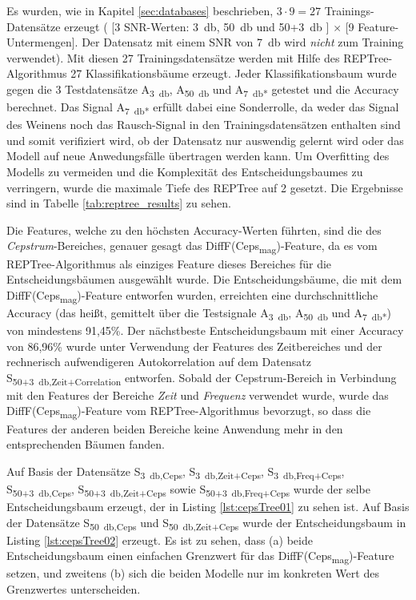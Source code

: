 Es wurden, wie in Kapitel \ref{sec:databases} beschrieben, $3 \cdot 9 = 27$ Trainings-Datensätze erzeugt ( [3 SNR-Werten: \SI{3}{\decibel}, \SI{50}{\decibel} und 50+\SI{3}{\decibel} ] $\times$ [9 Feature-Untermengen]. Der Datensatz mit einem SNR von \SI{7}{\decibel} wird \emph{nicht} zum Training verwendet). Mit diesen 27 Trainingsdatensätze werden mit Hilfe des REPTree-Algorithmus 27 Klassifikationsbäume erzeugt. Jeder Klassifikationsbaum wurde gegen die 3 Testdatensätze A\textsubscript{\SI{3}{\decibel}}, A\textsubscript{\SI{50}{\decibel}} und A\textsubscript{\SI{7}{\decibel}*} getestet und die Accuracy berechnet. Das Signal A\textsubscript{\SI{7}{\decibel}*} erfüllt dabei eine Sonderrolle, da weder das Signal des Weinens noch das Rausch-Signal in den Trainingsdatensätzen enthalten sind und somit verifiziert wird, ob der Datensatz nur \glqq auswendig gelernt\grqq{} wird oder das Modell auf neue Anwedungsfälle übertragen werden kann. Um Overfitting des Modells zu vermeiden und die Komplexität des Entscheidungsbaumes zu verringern, wurde die maximale Tiefe des REPTree auf 2 gesetzt. Die Ergebnisse sind in Tabelle \ref{tab:reptree_results} zu sehen.

Die Features, welche zu den höchsten Accuracy-Werten führten, sind die des \emph{Cepstrum}-Bereiches, genauer gesagt das DiffF(Ceps\textsubscript{mag})-Feature, da es vom REPTree-Algorithmus als einziges Feature dieses Bereiches für die Entscheidungsbäumen ausgewählt wurde. Die Entscheidungsbäume, die mit dem DiffF(Ceps\textsubscript{mag})-Feature entworfen wurden, erreichten eine durchschnittliche Accuracy (das heißt, gemittelt über die Testsignale A\textsubscript{\SI{3}{\decibel}}, A\textsubscript{\SI{50}{\decibel}} und A\textsubscript{\SI{7}{\decibel}*}) von mindestens 91,45\%. Der nächstbeste Entscheidungsbaum mit einer Accuracy von 86,96\% wurde unter Verwendung der Features des Zeitbereiches und der rechnerisch aufwendigeren Autokorrelation auf dem Datensatz S\textsubscript{50+\SI{3}{\decibel},Zeit+Correlation} entworfen. Sobald der Cepstrum-Bereich in Verbindung mit den Features der Bereiche \emph{Zeit} und \emph{Frequenz} verwendet wurde, wurde das DiffF(Ceps\textsubscript{mag})-Feature vom REPTree-Algorithmus bevorzugt, so dass die Features der anderen beiden Bereiche keine Anwendung mehr in den entsprechenden Bäumen fanden.

Auf Basis der Datensätze S\textsubscript{\SI{3}{\decibel},Ceps}, S\textsubscript{\SI{3}{\decibel},Zeit+Ceps}, S\textsubscript{\SI{3}{\decibel},Freq+Ceps}, S\textsubscript{50+\SI{3}{\decibel},Ceps}, S\textsubscript{50+\SI{3}{\decibel},Zeit+Ceps} sowie \linebreak S\textsubscript{50+\SI{3}{\decibel},Freq+Ceps} wurde der selbe Entscheidungsbaum erzeugt, der in Listing \ref{lst:cepsTree01} zu sehen ist. Auf Basis der Datensätze S\textsubscript{\SI{50}{\decibel},Ceps} und S\textsubscript{\SI{50}{\decibel},Zeit+Ceps} wurde der Entscheidungsbaum in Listing \ref{lst:cepsTree02} erzeugt. Es ist zu sehen, dass (a) beide Entscheidungsbaum einen einfachen Grenzwert für das DiffF(Ceps\textsubscript{mag})-Feature setzen, und zweitens (b) sich die beiden Modelle nur im konkreten Wert des Grenzwertes unterscheiden. 

